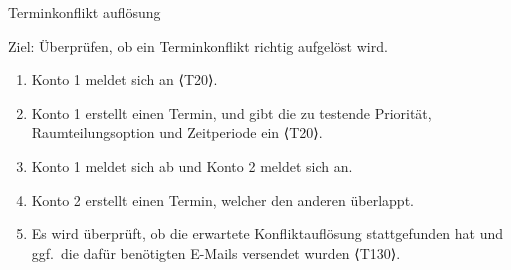 \begin{scenario}{50}{Terminkonflikt auflösung}
  \item[Ziel:] Überprüfen, ob ein Terminkonflikt richtig aufgelöst wird.
  \begin{enumerate}
    \item Konto 1 meldet sich an ⟨T20⟩.
    \item Konto 1 erstellt einen Termin, und gibt die zu testende Priorität, Raumteilungsoption und Zeitperiode ein ⟨T20⟩.
    \item Konto 1 meldet sich ab und Konto 2 meldet sich an.
    \item Konto 2 erstellt einen Termin, welcher den anderen überlappt.
    \item Es wird überprüft, ob die erwartete Konfliktauflösung stattgefunden hat und ggf.\ die dafür benötigten E-Mails versendet wurden ⟨T130⟩.
  \end{enumerate}
\end{scenario}







